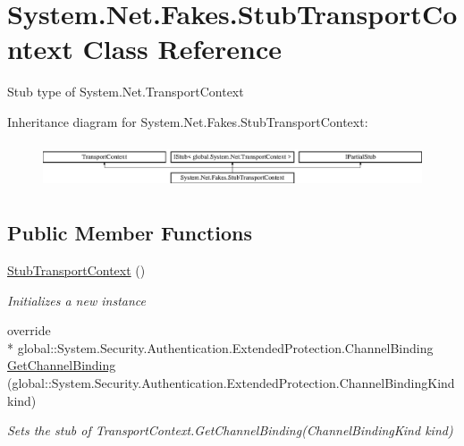 \hypertarget{class_system_1_1_net_1_1_fakes_1_1_stub_transport_context}{\section{System.\-Net.\-Fakes.\-Stub\-Transport\-Context Class Reference}
\label{class_system_1_1_net_1_1_fakes_1_1_stub_transport_context}
}


Stub type of System.\-Net.\-Transport\-Context 


Inheritance diagram for System.\-Net.\-Fakes.\-Stub\-Transport\-Context\-:\begin{figure}[H]
\begin{center}
\leavevmode
\includegraphics[height=1.367521cm]{class_system_1_1_net_1_1_fakes_1_1_stub_transport_context}
\end{center}
\end{figure}
\subsection*{Public Member Functions}
\begin{DoxyCompactItemize}
\item 
\hyperlink{class_system_1_1_net_1_1_fakes_1_1_stub_transport_context_a319158601b68c1cfce0ec8dc4c0dc6f7}{Stub\-Transport\-Context} ()
\begin{DoxyCompactList}\small\item\em Initializes a new instance\end{DoxyCompactList}\item 
override \\*
global\-::\-System.\-Security.\-Authentication.\-Extended\-Protection.\-Channel\-Binding \hyperlink{class_system_1_1_net_1_1_fakes_1_1_stub_transport_context_ab909cc562c815306e76a63b71ae2ca1a}{Get\-Channel\-Binding} (global\-::\-System.\-Security.\-Authentication.\-Extended\-Protection.\-Channel\-Binding\-Kind kind)
\begin{DoxyCompactList}\small\item\em Sets the stub of Transport\-Context.\-Get\-Channel\-Binding(\-Channel\-Binding\-Kind kind)\end{DoxyCompactList}\end{DoxyCompactItemize}
